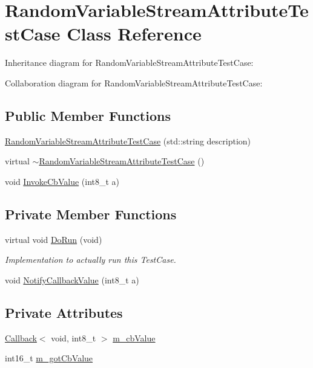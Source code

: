 \hypertarget{classRandomVariableStreamAttributeTestCase}{}\section{Random\+Variable\+Stream\+Attribute\+Test\+Case Class Reference}
\label{classRandomVariableStreamAttributeTestCase}


Inheritance diagram for Random\+Variable\+Stream\+Attribute\+Test\+Case\+:


Collaboration diagram for Random\+Variable\+Stream\+Attribute\+Test\+Case\+:
\subsection*{Public Member Functions}
\begin{DoxyCompactItemize}
\item 
\hyperlink{classRandomVariableStreamAttributeTestCase_ae57fb1dd63db48f3b5b32f0ef8519662}{Random\+Variable\+Stream\+Attribute\+Test\+Case} (std\+::string description)
\item 
virtual \hyperlink{classRandomVariableStreamAttributeTestCase_a5cae114322a6e0c82380a9edfe2ed088}{$\sim$\+Random\+Variable\+Stream\+Attribute\+Test\+Case} ()
\item 
void \hyperlink{classRandomVariableStreamAttributeTestCase_a07cc02840ace30f1571452980ecf845f}{Invoke\+Cb\+Value} (int8\+\_\+t a)
\end{DoxyCompactItemize}
\subsection*{Private Member Functions}
\begin{DoxyCompactItemize}
\item 
virtual void \hyperlink{classRandomVariableStreamAttributeTestCase_aacc702c884c0f163189deac202fff8fa}{Do\+Run} (void)
\begin{DoxyCompactList}\small\item\em Implementation to actually run this Test\+Case. \end{DoxyCompactList}\item 
void \hyperlink{classRandomVariableStreamAttributeTestCase_aaff7303370c6a372e81e2a1dd4e8cacd}{Notify\+Callback\+Value} (int8\+\_\+t a)
\end{DoxyCompactItemize}
\subsection*{Private Attributes}
\begin{DoxyCompactItemize}
\item 
\hyperlink{classns3_1_1Callback}{Callback}$<$ void, int8\+\_\+t $>$ \hyperlink{classRandomVariableStreamAttributeTestCase_a20bab4601e2a135e27bb353239fdb95d}{m\+\_\+cb\+Value}
\item 
int16\+\_\+t \hyperlink{classRandomVariableStreamAttributeTestCase_aed588b3cd61700dcea4070136d141e09}{m\+\_\+got\+Cb\+Value}
\end{DoxyCompactItemize}
